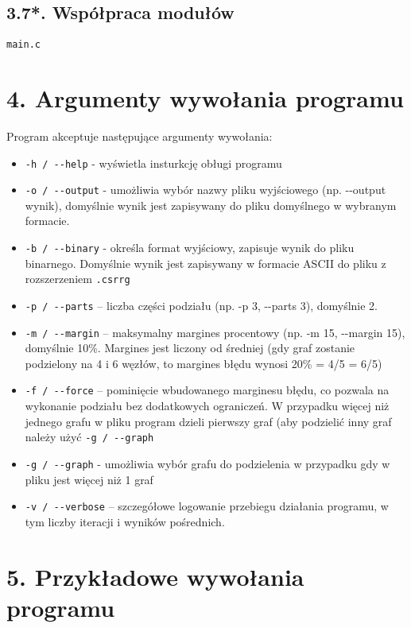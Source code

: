 \documentclass[]{article}
\begin{document}
\subsection{3.7*. Współpraca modułów}
\begin{lstlisting}
main.c
\end{lstlisting}

\section{4. Argumenty wywołania programu}\label{header-n256}

Program akceptuje następujące argumenty wywołania:

\begin{itemize}
\item 
    \texttt{-h / -\/-help} - wyświetla insturkcję obługi programu

\item 
    \texttt{-o / -\/-output} - umożliwia wybór nazwy pliku wyjściowego (np. -\/-output wynik), domyślnie wynik jest zapisywany do pliku domyślnego w wybranym formacie.
\item 
    \texttt{-b / -\/-binary} - określa format wyjściowy, zapisuje wynik do pliku binarnego. Domyślnie wynik jest zapisywany w formacie ASCII do pliku z rozszerzeniem \texttt{.csrrg}
 
\item
    \texttt{-p / -\/-parts} – liczba części podziału (np. -p 3, -\/-parts 3), domyślnie 2.
\item
    \texttt{-m / -\/-margin} – maksymalny margines procentowy (np. -m 15, -\/-margin 15), domyślnie 10\%. Margines jest liczony od średniej (gdy graf zostanie podzielony na 4 i 6 węzłów, to margines błędu wynosi 20\% = 4/5 = 6/5)
\item
    \texttt{-f / -\/-force} – pominięcie wbudowanego marginesu błędu, co pozwala na wykonanie podziału bez dodatkowych ograniczeń. W przypadku więcej niż jednego grafu w pliku program dzieli pierwszy graf (aby podzielić inny graf należy użyć \texttt{-g / -\/-graph}
\item 
    \texttt{-g / -\/-graph} - umożliwia wybór grafu do podzielenia w przypadku gdy w pliku jest więcej niż 1 graf
\item
    \texttt{-v / -\/-verbose} – szczegółowe logowanie przebiegu działania programu, w tym liczby iteracji i wyników pośrednich.
\end{itemize}

\section{5. Przykładowe wywołania programu}
\end{document}
